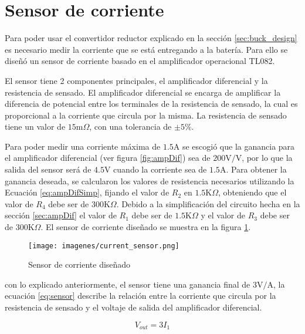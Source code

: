 \section{Sensor de corriente}

    Para poder usar el convertidor reductor explicado en la sección
    \ref{sec:buck_design} es necesario medir la corriente que se
    está entregando a la batería. Para ello se diseñó un sensor de corriente
    basado en el amplificador operacional TL082.

    El sensor tiene 2 componentes principales, el amplificador diferencial y 
    la resistencia de sensado. El amplificador diferencial se encarga de 
    amplificar la diferencia de potencial entre los terminales de la resistencia
    de sensado, la cual es proporcional a la corriente que circula por la misma.
    La resistencia de sensado tiene un valor de $15 \text{m}\Omega$, con una
     tolerancia de $\pm 5\%$.

    Para poder medir una corriente máxima de $1.5\text{A}$ se escogió que 
    la ganancia para el amplificador diferencial (ver figura \ref{fig:ampDif})
    sea de $200\text{V/V}$, por lo que la salida del sensor será de
    $4.5\text{V}$ cuando la corriente sea de $1.5\text{A}$. Para obtener
    la ganancia deseada, se calcularon los valores de resistencia 
    necesarios utilizando la Ecuación \ref{eq:ampDifSimp}, fijando 
    el valor de $R_2$ en
    $1.5\text{K}\Omega$, obteniendo que el valor de $R_4$ debe ser de 
    $300\text{K}\Omega$. Debido a la  simplificación del circuito hecha en la 
    sección \ref{sec:ampDif} el valor de $R_1$ debe ser de $1.5\text{K}\Omega$
    y el valor de $R_3$ debe ser de $300\text{K}\Omega$. El sensor de corriente 
    diseñado se muestra en la figura \ref{fig:sensor_corriente}.

    \begin{figure}[H]
        \centering
        \texttt{[image: imagenes/current\_sensor.png]}
        \caption{Sensor de corriente diseñado}
        \label{fig:sensor_corriente}
    \end{figure}

    con lo explicado anteriormente, el sensor tiene una ganancia final de 
    $3\text{V/A}$, la ecuación \ref{eq:sensor} describe la relación entre
    la corriente que circula por la resistencia de sensado y el voltaje de salida
    del amplificador diferencial.

    \begin{equation}
        V_{out} = 3I_1
        \label{eq:sensor}
    \end{equation}
    
